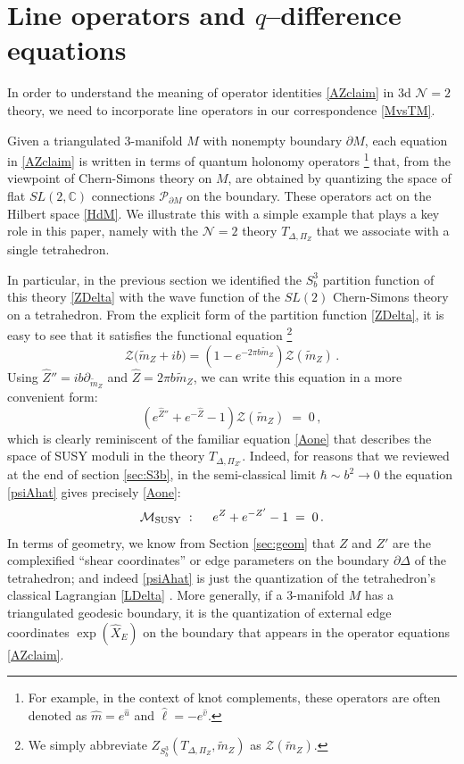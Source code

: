 \documentclass[hyper,letterpaper]{JHEP3}
\numberwithin{equation}{section}
\newcommand{\be}{\begin{equation}}
\newcommand{\ee}{\end{equation}}
\newcommand{\C}{{\mathbb C}}
\newcommand{\pd}{\partial}
\newcommand{\CM}{\mathcal{M}}
\newcommand{\CN}{\mathcal{N}}
\newcommand{\CP}{\mathcal{P}}
\newcommand{\CZ}{\mathcal{Z}}
\begin{document}

\section{Line operators and $q$--difference equations}
\label{sec:lines}

In order to understand the meaning of operator identities \eqref{AZclaim}
in 3d $\CN=2$ theory, we need to incorporate line operators in our correspondence \eqref{MvsTM}.

Given a triangulated 3-manifold $M$ with nonempty boundary $\pd M$, each equation in \eqref{AZclaim}
is written in terms of quantum holonomy operators%
%
\footnote{For example, in the context of knot complements, these operators are often denoted as $\hat m=e^{\hat u}$ and $\hat \ell=-e^{\hat v}$.} %
%
that, from the viewpoint of Chern-Simons theory on $M$, are obtained by quantizing the space of flat $SL(2,\C)$ connections $\CP_{\pd M}$ on the boundary. These operators act on the Hilbert space \eqref{HdM}.
We illustrate this with a simple example that plays a key role in this paper, namely
with the $\CN=2$ theory $T_{\Delta,\Pi_Z}$ that we associate with a single tetrahedron.


In particular, in the previous section we identified the $S^3_b$ partition function
of this theory \eqref{ZDelta} with the wave function of the $SL(2)$ Chern-Simons theory on a tetrahedron. From the explicit form of the partition function \eqref{ZDelta}, it is easy to
see that it satisfies the functional equation%
%
\footnote{We simply abbreviate $Z_{S^3_b}(T_{\Delta,\Pi_Z},\tilde m_Z)$ as $\CZ(\tilde m_Z)$.}
%
\be
\CZ(\tilde m_Z + ib \big) = \left( 1 - e^{-2\pi b \tilde m_Z} \right) \CZ(\tilde m_Z ) \,.
\ee
Using $\hat Z''= ib\partial_{\tilde m_Z}$ and $\hat Z=2\pi b\tilde{m}_Z$, we can write this equation in
a more convenient form:
\be
\left( e^{\hat Z''} + e^{-\hat Z} - 1 \right) \CZ(\tilde m_Z) \; = \; 0 \,,
\label{psiAhat}
\ee
which is clearly reminiscent of the familiar equation \eqref{Aone}
that describes the space of SUSY moduli in the theory $T_{\Delta, \Pi_{Z'}}$.
Indeed, for reasons that we reviewed at the end of section \ref{sec:S3b},
in the semi-classical limit $\hbar \sim b^2 \to 0$ the equation \eqref{psiAhat}
gives precisely \eqref{Aone}:
\be
\CM_{{\rm SUSY}}
~:~ \quad
e^Z + e^{- Z'} - 1 \; = \; 0 \,.
\label{apoltetr}
\ee
%
In terms of geometry, we know from Section \ref{sec:geom} that $Z$ and $Z'$ are the complexified ``shear coordinates'' or edge parameters on the boundary $\pd \Delta$ of the tetrahedron; and indeed \eqref{psiAhat} is just the quantization of the tetrahedron's classical Lagrangian \eqref{LDelta} \cite{Dimofte-QRS}. More generally, if a 3-manifold $M$ has a triangulated geodesic boundary, it is the quantization of external edge coordinates $\exp(\hat X_E)$ on the boundary that appears in the operator equations \eqref{AZclaim}.
\end{document}
